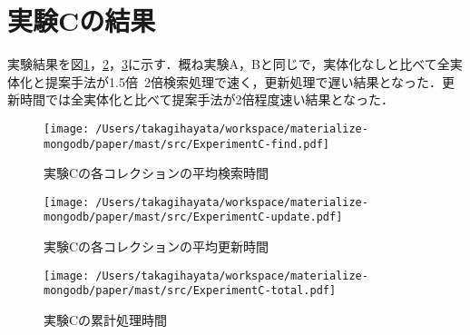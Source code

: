 \documentclass[a4paper,11pt]{ujreport}
\begin{document}
\section{実験Cの結果}
実験結果を図\ref{ExperimentC-find}，\ref{ExperimentC-update}，\ref{ExperimentC-total}に示す．概ね実験A，Bと同じで，実体化なしと比べて全実体化と提案手法が1.5倍~2倍検索処理で速く，更新処理で遅い結果となった．更新時間では全実体化と比べて提案手法が2倍程度速い結果となった．
\begin{figure}[htbp]
	\begin{center}
		\texttt{[image: /Users/takagihayata/workspace/materialize-mongodb/paper/mast/src/ExperimentC-find.pdf]} %
	\end{center}
	\caption{実験Cの各コレクションの平均検索時間}
	\label{ExperimentC-find}
\end{figure}
\begin{figure}[htbp]
	\begin{center}
		\texttt{[image: /Users/takagihayata/workspace/materialize-mongodb/paper/mast/src/ExperimentC-update.pdf]} %
	\end{center}
	\caption{実験Cの各コレクションの平均更新時間}
	\label{ExperimentC-update}
\end{figure}
\begin{figure}[htbp]
	\begin{center}
		\texttt{[image: /Users/takagihayata/workspace/materialize-mongodb/paper/mast/src/ExperimentC-total.pdf]} %
	\end{center}
	\caption{実験Cの累計処理時間}
	\label{ExperimentC-total}
\end{figure}
\end{document}

